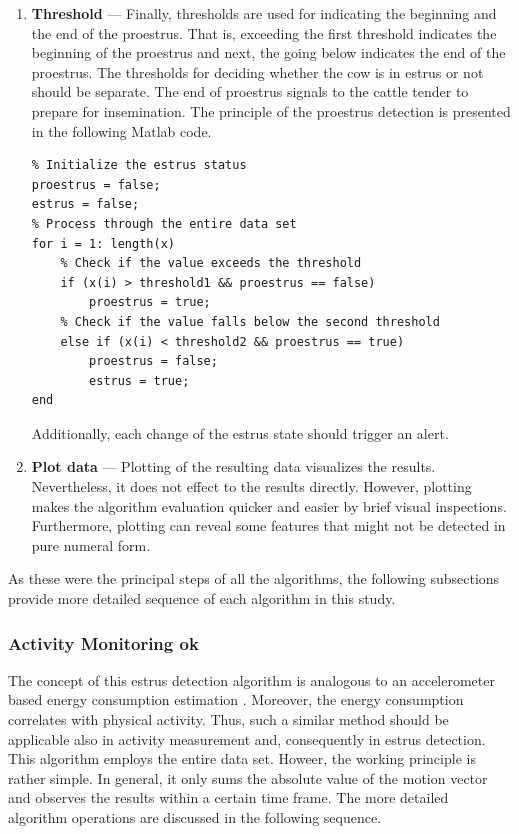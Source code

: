 \documentclass[english,12pt,a4paper,pdftex,elec,utf8]{aaltothesis}
\begin{document}
\begin{enumerate}
\item \textbf{Threshold} --- Finally, thresholds are used for indicating the beginning and the end of the proestrus. That is, exceeding the first threshold indicates the beginning of the proestrus and next, the going below indicates the end of the proestrus. The thresholds for deciding whether the cow is in estrus or not should be separate. The end of proestrus signals to the cattle tender to prepare for insemination. The principle of the proestrus detection is presented in the following Matlab code.  


\begin{lstlisting}
% Initialize the estrus status
proestrus = false;
estrus = false;
% Process through the entire data set
for i = 1: length(x)
	% Check if the value exceeds the threshold
	if (x(i) > threshold1 && proestrus == false)	
		proestrus = true;
	% Check if the value falls below the second threshold
	else if (x(i) < threshold2 && proestrus == true)
 		proestrus = false;
 		estrus = true;
end
\end{lstlisting}
Additionally, each change of the estrus state should trigger an alert.

\item \textbf{Plot data} --- Plotting of the resulting data visualizes the results. Nevertheless, it does not effect to the results directly. However, plotting makes the algorithm evaluation quicker and easier by brief visual inspections. Furthermore, plotting can reveal some features that might not be detected in pure numeral form.

\end{enumerate}
As these were the principal steps of all the algorithms, the following subsections provide more detailed sequence of each algorithm in this study.

\subsubsection{Activity Monitoring ok} \label{activitymeasurementsection}

The concept of this estrus detection algorithm is analogous to an accelerometer based energy consumption estimation \cite{Kang2012}. Moreover, the energy consumption correlates with physical activity. Thus, such a similar method should be applicable also in activity measurement and, consequently in estrus detection. This algorithm employs the entire data set. Howeer, the working principle is rather simple. In general, it only sums the absolute value of the motion vector and observes the results within a certain time frame. The more detailed algorithm operations are discussed in the following sequence.
\end{document}
